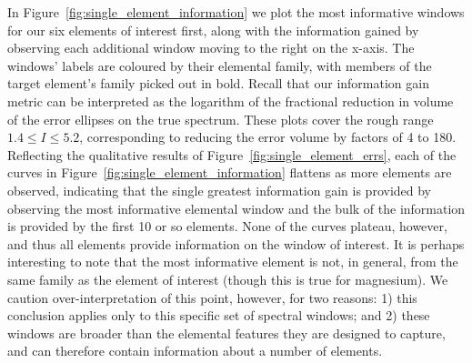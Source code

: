 \documentclass[a4paper,fleqn,usenatbib]{mnras}
\begin{document}


In Figure~\ref{fig:single_element_information} we plot the most informative windows for our six elements of interest first, along with the information gained by observing each additional window moving to the right on the x-axis. The windows' labels are coloured by their elemental family, with members of the target element's family picked out in bold. Recall that our information gain metric can be interpreted as the logarithm of the fractional reduction in volume of the error ellipses on the true spectrum. These plots cover the rough range $1.4 \le I \le 5.2$, corresponding to reducing the error volume by factors of 4 to 180. Reflecting the qualitative results of Figure~\ref{fig:single_element_errs}, each of the curves in Figure~\ref{fig:single_element_information} flattens as more elements are observed, indicating that the single greatest information gain is provided by observing the most informative elemental window and the bulk of the information is provided by the first 10 or so elements. None of the curves plateau, however, and thus all elements provide information on the window of interest. It is perhaps interesting to note that the most informative element is not, in general, from the same family as the element of interest (though this is true for magnesium). We caution over-interpretation of this point, however, for two reasons: 1) this conclusion applies only to this specific set of spectral windows; and 2) these windows are broader than the elemental features they are designed to capture, and can therefore contain information about a number of elements.

\end{document}
